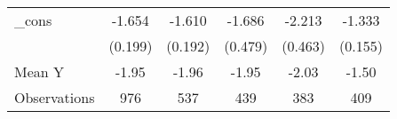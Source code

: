{\begin{tabular}{l*{5}{c}}
\addlinespace
\_cons      &      -1.654\sym{***}&      -1.610\sym{***}&      -1.686\sym{***}&      -2.213\sym{***}&      -1.333\sym{***}\\
            &     (0.199)         &     (0.192)         &     (0.479)         &     (0.463)         &     (0.155)         \\
\midrule
Mean Y      &       -1.95         &       -1.96         &       -1.95         &       -2.03         &       -1.50         \\
Observations&         976         &         537         &         439         &         383         &         409         \\
\bottomrule
\end{tabular}
}
